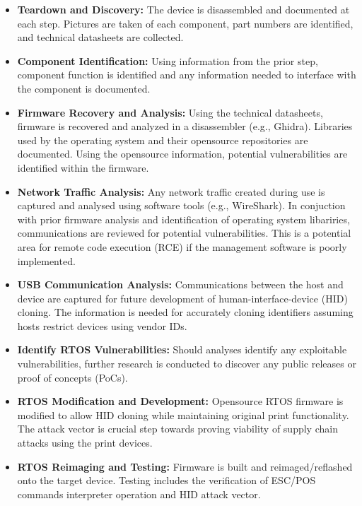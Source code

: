 
\begin{itemize}
  \item \textbf{Teardown and Discovery:} The device is disassembled and documented at each step. Pictures are taken of each component, part numbers are identified, and technical datasheets are collected.
  \item \textbf{Component Identification:} Using information from the prior step, component function is identified and any information needed to interface with the component is documented.
  \item \textbf{Firmware Recovery and Analysis:} Using the technical datasheets, firmware is recovered and analyzed in a disassembler (e.g., Ghidra). Libraries used by the operating system and their opensource repositories are documented. Using the opensource information, potential vulnerabilities are identified within the firmware.
  \item \textbf{Network Traffic Analysis:} Any network traffic created during use is captured and analysed using software tools (e.g., WireShark). In conjuction with prior firmware analysis and identification of operating system libariries, communications are reviewed for potential vulnerabilities. This is a potential area for remote code execution (RCE) if the management software is poorly implemented.
  \item \textbf{USB Communication Analysis:} Communications between the host and device are captured for future development of human-interface-device (HID) cloning. The information is needed for accurately cloning identifiers assuming hosts restrict devices using vendor IDs. 
  \item \textbf{Identify RTOS Vulnerabilities:} Should analyses identify any exploitable vulnerabilities, further research is conducted to discover any public releases or proof of concepts (PoCs).
  \item \textbf{RTOS Modification and Development:} Opensource RTOS firmware is modified to allow HID cloning while maintaining original print functionality. The attack vector is crucial step towards proving viability of supply chain attacks using the print devices.
  \item \textbf{RTOS Reimaging and Testing:} Firmware is built and reimaged/reflashed onto the target device. Testing includes the verification of ESC/POS commands interpreter operation and HID attack vector. 
\end{itemize}


